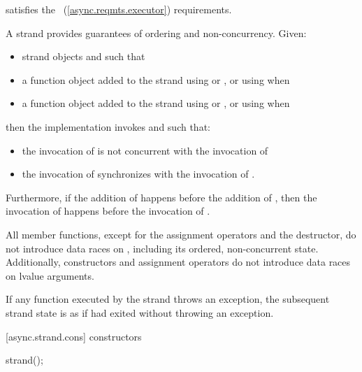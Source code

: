 \pnum
{} satisfies the ~(\ref{async.reqmts.executor}) requirements.

\pnum
 A strand provides guarantees of ordering and non-concurrency. Given:

\begin{itemize}
\item
strand objects  and  such that 

\item
a function object  added to the strand  using  or , or using  when 

\item
a function object  added to the strand  using  or , or using  when 
\end{itemize}

\pnum
then the implementation invokes  and  such that:

\begin{itemize}
\item
the invocation of  is not concurrent with the invocation of 

\item
the invocation of  synchronizes with the invocation of .
\end{itemize}

\pnum
Furthermore, if the addition of  happens before the addition of , then the invocation of  happens before the invocation of .

\pnum
All member functions, except for the assignment operators and the destructor, do not introduce data races on , including its ordered, non-concurrent state. Additionally, constructors and assignment operators do not introduce data races on lvalue arguments.

\pnum
If any function  executed by the strand throws an exception, the subsequent strand state is as if  had exited without throwing an exception.


[async.strand.cons]{ constructors}

%
\begin{itemdecl}
strand();
\end{itemdecl}

